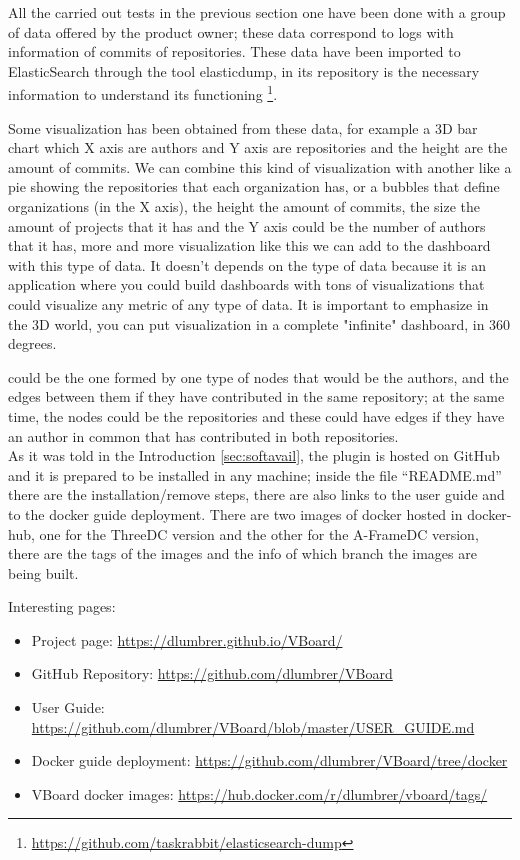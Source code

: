 \documentclass[a4paper, 12pt]{book}
\begin{document}
All the carried out tests in the previous section one have been done with a group of data offered by the product owner; these data correspond to logs with information of commits of repositories.
These data have been imported to ElasticSearch through the tool elasticdump, in its repository is the necessary information to understand its functioning \footnote{\url{https://github.com/taskrabbit/elasticsearch-dump}}.

Some visualization has been obtained from these
data, for example a 3D bar chart which X axis are authors and Y axis are repositories and the height are the amount of commits. We can combine this kind of visualization with another like a pie showing the repositories that each organization has, or a bubbles that define organizations (in the X axis), the height the amount of commits, the size the amount of projects that it has and the Y axis could be the number of authors that it has, more and more visualization like this we can add to the dashboard with this type of data. It doesn't depends on the type of data because it is an application where you could build dashboards with tons of visualizations that could visualize any metric of any type of data. It is important to emphasize in the 3D world, you can put visualization in a complete "infinite" dashboard, in 360 degrees.

could be the one formed by one type of nodes that would be the authors, and the edges between them if they have contributed in the same repository; at the same time, the nodes could be the repositories and these could have edges if they have an author in common that has contributed in both repositories.\\

As it was told in the Introduction \ref{sec:softavail}, the plugin is hosted on GitHub and it is prepared to be installed in any machine; inside the file “README.md” there are the installation/remove steps, there are also links to the user guide and to the docker guide deployment. There are two images of docker hosted in docker-hub, one for the ThreeDC version and the other for the A-FrameDC version, there are the tags of the images and the info of which branch the images are being built.

Interesting pages:

\begin{itemize}
\item Project page: \url{https://dlumbrer.github.io/VBoard/}
\item GitHub Repository: \url{https://github.com/dlumbrer/VBoard}
\item User Guide: \url{https://github.com/dlumbrer/VBoard/blob/master/USER_GUIDE.md}
\item Docker guide deployment: \url{https://github.com/dlumbrer/VBoard/tree/docker}
\item VBoard docker images: \url{https://hub.docker.com/r/dlumbrer/vboard/tags/}
\end{itemize}
\end{document}

